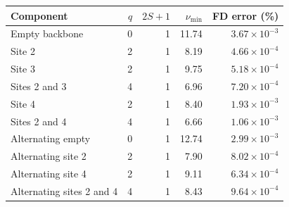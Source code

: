 \begin{tabular}{lrrrr}\toprule
Component & $q$ & $2S+1$ & $\nu_{\min}$ & FD error (\%)\\\midrule
Empty backbone & 0 & 1 & 11.74 & $3.67\times10^{-3}$\\
Site 2 & 2 & 1 & 8.19 & $4.66\times10^{-4}$\\
Site 3 & 2 & 1 & 9.75 & $5.18\times10^{-4}$\\
Sites 2 and 3 & 4 & 1 & 6.96 & $7.20\times10^{-4}$\\
Site 4 & 2 & 1 & 8.40 & $1.93\times10^{-3}$\\
Sites 2 and 4 & 4 & 1 & 6.66 & $1.06\times10^{-3}$\\
Alternating empty & 0 & 1 & 12.74 & $2.99\times10^{-3}$\\
Alternating site 2 & 2 & 1 & 7.90 & $8.02\times10^{-4}$\\
Alternating site 4 & 2 & 1 & 9.11 & $6.34\times10^{-4}$\\
Alternating sites 2 and 4 & 4 & 1 & 8.43 & $9.64\times10^{-4}$\\
\bottomrule\end{tabular}
